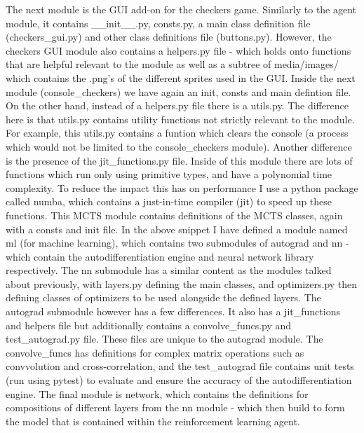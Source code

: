 \documentclass{article}
\begin{document}
    The next module is the GUI add-on for the checkers game. Similarly to the agent module, it contains \_\_init\_\_.py, consts.py, a main class definition file (checkers\_gui.py) and other class definitions file (buttons.py). 
    However, the checkers GUI module also contains a helpers.py file - which holds onto functions that are helpful relevant to the module as well as a subtree of media/images/ which contains the .png's of the different sprites used in the GUI.
    Inside the next module (console\_checkers) we have again an init, consts and main defintion file. On the other hand, instead of a helpers.py file there is a utils.py. The difference here is that
    utils.py contains utility functions not strictly relevant to the module. For example, this utils.py contains a funtion which clears the console (a process which would not be limited to the console\_checkers module).
    Another difference is the presence of the jit_functions.py file. Inside of this module there are lots of functions which run only using primitive types, and have a polynomial time complexity. To reduce the impact this 
    has on performance I use a python package called numba, which contains a just-in-time compiler (jit) to speed up these functions.
    This MCTS module contains definitions of the MCTS classes, again with a consts and init file.
    In the above snippet I have defined a module named ml (for machine learning), which contains two submodules of autograd and nn - which contain the autodifferentiation engine and neural
    network library respectively. The nn submodule has a similar content as the modules talked about previously, with layers.py defining the main classes, and optimizers.py then defining classes
    of optimizers to be used alongside the defined layers. The autograd submodule however has a few differences. It also has a jit_functions and helpers file but additionally contains a convolve_funcs.py and
    test_autograd.py file. These files are unique to the autograd module. The convolve_funcs has definitions for complex matrix operations such as convvolution and cross-correlation, and the test_autograd file
    contains unit tests (run using pytest) to evaluate and ensure the accuracy of the autodifferentiation engine.
    The final module is network, which contains the definitions for compositions of different layers from the nn module - which then build to form the model that is contained within the reinforcement
    learning agent.
\end{document}
